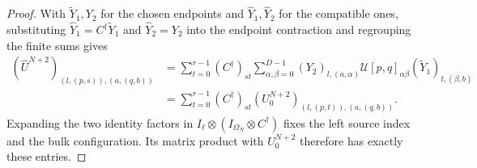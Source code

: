 \begin{proof}\leanok
    With $\widetilde Y_1,Y_2$ for the chosen endpoints and
    $\widehat Y_1,\widehat Y_2$ for the compatible ones, substituting
    $\widehat Y_1=C^\dagger\widetilde Y_1$ and $\widehat Y_2=Y_2$
    into the endpoint contraction and regrouping the finite sums gives
    \begin{align}
        (\widehat U^{N+2})_{(l,(p,s)),(a,(q,b))}
         & =\sum_{t=0}^{r-1}(C^\dagger)_{st}
        \sum_{\alpha,\beta=0}^{D-1}(Y_2)_{l,(a,\alpha)}
        \mathcal U[p,q]_{\alpha\beta}(\widetilde Y_1)_{t,(\beta,b)} \\
         & =\sum_{t=0}^{r-1}(C^\dagger)_{st}
        (U_0^{N+2})_{(l,(p,t)),(a,(q,b))}.
    \end{align}
    Expanding the two identity factors in
    $I_\ell\otimes(I_{\Omega_N}\otimes C^\dagger)$ fixes the left
    source index and the bulk configuration. Its matrix product with
    $U_0^{N+2}$ therefore has exactly these entries.
\end{proof}

